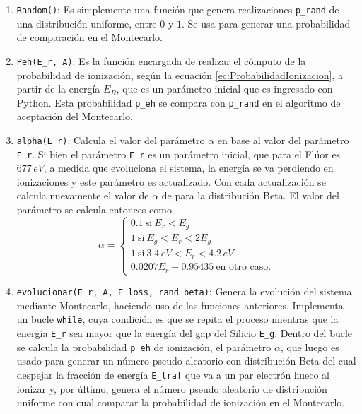 \begin{enumerate}[label=\arabic*., listparindent=1.5em]
    \item \verb|Random()|: Es simplemente una función que genera realizaciones \verb|p_rand| de una distribución uniforme, entre $0$ y $1$. Se usa para generar una probabilidad de comparación en el Montecarlo.
    \item \verb|Peh(E_r, A)|: Es la función encargada de realizar el cómputo de la probabilidad de ionización, según la ecuación \eqref{ec:ProbabilidadIonizacion}, a partir de la energía $E_{R}$, que es un parámetro inicial que es ingresado con Python. Esta probabilidad \verb|p_eh| se compara con \verb|p_rand| en el algoritmo de aceptación del Montecarlo.
    \item \verb|alpha(E_r)|: Calcula el valor del parámetro $\alpha$ en base al valor del parámetro \verb|E_r|. Si bien el parámetro \verb|E_r| es un parámetro inicial, que para el Flúor es $677\,\si{eV}$, a medida que evoluciona el sistema, la energía se va perdiendo en ionizaciones y este parámetro es actualizado. Con cada actualización se calcula nuevamente el valor de $\alpha$ de para la distribución Beta. El valor del parámetro se calcula entonces como
    \begin{equation*}
        \alpha =
        \left\{
            \begin{matrix}
                0.1\ \mbox{si}\ E_{r} < E_{g}\\
                1\ \mbox{si}\ E_{g} < E_{r} < 2E_{g}\\
                1\ \mbox{si}\ 3.4\,\si{eV} < E_{r} < 4.2\,\si{eV}\\
                0.0207E_{r} + 0.95435\ \mbox{en otro caso.}
            \end{matrix}
        \right.
    \end{equation*}
    \item \verb|evolucionar(E_r, A, E_loss, rand_beta)|: Genera la evolución del sistema mediante Montecarlo, haciendo uso de las funciones anteriores. Implementa un bucle \verb|while|, cuya condición es que se repita el proceso mientras que la energía \verb|E_r| sea mayor que la energía del gap del Silicio \verb|E_g|. Dentro del bucle se calcula la probabilidad \verb|p_eh| de ionización, el parámetro $\alpha$, que luego es usado para generar un número pseudo aleatorio con distribución Beta del cual despejar la fracción de energía \verb|E_traf| que va a un par electrón hueco al ionizar y, por último, genera el número pseudo aleatorio de distribución uniforme con cual comparar la probabilidad de ionización en el Montecarlo.\\

\end{enumerate}
